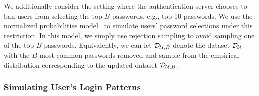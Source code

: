  We additionally consider the setting where the authentication server chooses to ban users from selecting the top $B$ passwords, e.g., top 10 passwords. We use the normalized probabilities model~\cite{BKPS:ACMEC13} to simulate users' password selections under this restriction. In this model, we simply use rejection sampling to avoid sampling one of the top $B$ passwords. Equivalently, we can let $\mathcal{D}_{{\mathcal{U}, B}}$ denote the dataset $\mathcal{D}_{{\mathcal{U}}}$ with the $B$ most common passwords removed and sample from the empirical distribution corresponding to the updated dataset $\mathcal{D}_{{\mathcal{U}, B}}$.












\subsubsection{Simulating User's Login Patterns}\label{section:ExperimentDesign-subsection:SimulateUser-subsubsection:SimulateLoginPattern} %

